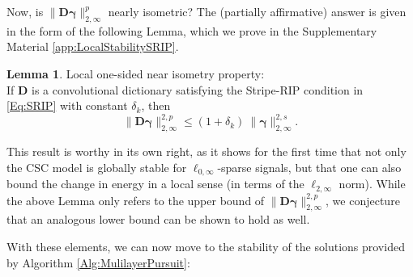 \documentclass[10pt,journal]{IEEEtran}
\def\D{{\mathbf D}}
\def\gama{{\boldsymbol \gamma}}
\def\Loi{{\ell_{0,\infty}}}
\theoremstyle{plain}
\theoremstyle{definition}
\newtheorem{lemma}{Lemma}
\begin{document}
Now, is $\|\D\gama\|^{p}_{2,\infty}$ nearly isometric? The (partially affirmative) answer is given in the form of the following Lemma, which we prove in the Supplementary Material \ref{app:LocalStabilitySRIP}.

\begin{lemma}{Local one-sided near isometry property:} \label{lemma:LocalSRIP} \\
If $\D$ is a convolutional dictionary satisfying the Stripe-RIP condition in \eqref{Eq:SRIP} with constant $\delta_k$, then
\begin{equation}
	\|\D\gama\|^{2,p}_{2,\infty} \leq (1+\delta_k)\ \|\gama\|^{2,s}_{2,\infty}.
\end{equation}
\end{lemma}

This result is worthy in its own right, as it shows for the first time that not only the CSC model is globally stable for $\Loi$-sparse signals, but that one can also bound the change in energy in a local sense (in terms of the $\ell_{2,\infty}$ norm). %
While the above Lemma only refers to the upper bound of $\|\D\gama\|^{2,p}_{2,\infty}$, we conjecture that an analogous lower bound can be shown to hold as well. %

With these elements, we can now move to the stability of the solutions provided by Algorithm \ref{Alg:MulilayerPursuit}:
\end{document}

